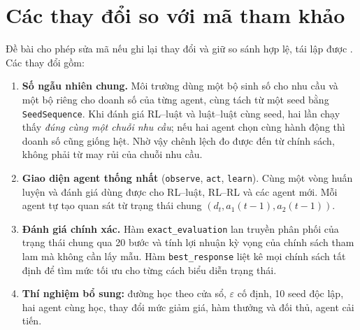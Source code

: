 \documentclass[12pt,a4paper]{report}
\begin{document}
\section{Các thay đổi so với mã tham khảo}
Đề bài cho phép sửa mã nếu ghi lại thay đổi và giữ so sánh hợp lệ, tái lập được
\cite{assignment}. Các thay đổi gồm:
\begin{enumerate}[label=\textbf{M\arabic*.}]
\item \textbf{Số ngẫu nhiên chung.} Môi trường dùng một bộ sinh số cho nhu cầu và
  một bộ riêng cho doanh số của từng agent, cùng tách từ một seed bằng
  \texttt{SeedSequence}. Khi đánh giá RL--luật và luật--luật cùng seed, hai lần chạy
  thấy \emph{đúng cùng một chuỗi nhu cầu}; nếu hai agent chọn cùng hành động thì
  doanh số cũng giống hệt. Nhờ vậy chênh lệch đo được đến từ chính sách, không
  phải từ may rủi của chuỗi nhu cầu.
\item \textbf{Giao diện agent thống nhất} (\texttt{observe}, \texttt{act},
  \texttt{learn}). Cùng một vòng huấn luyện và đánh giá dùng được cho RL--luật,
  RL--RL và các agent mới. Mỗi agent tự tạo quan sát từ trạng thái chung
  $(d_t,a_1(t-1),a_2(t-1))$.
\item \textbf{Đánh giá chính xác.} Hàm \texttt{exact\_evaluation} lan truyền phân
  phối của trạng thái chung qua 20 bước và tính lợi nhuận kỳ vọng của chính sách
  tham lam mà không cần lấy mẫu. Hàm \texttt{best\_response} liệt kê mọi chính sách
  tất định để tìm mức tối ưu cho từng cách biểu diễn trạng thái.
\item \textbf{Thí nghiệm bổ sung:} đường học theo cửa sổ, $\varepsilon$ cố định,
  10 seed độc lập, hai agent cùng học, thay đổi mức giảm giá, hàm thưởng và đối
  thủ, agent cải tiến.
\end{enumerate}
\end{document}
